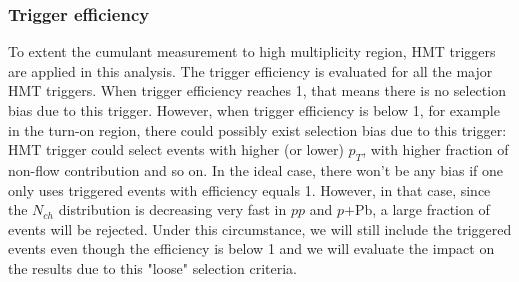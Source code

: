 \subsubsection{Trigger efficiency}
To extent the cumulant measurement to high multiplicity region, HMT triggers are applied in this analysis. The trigger efficiency is evaluated for all the major HMT triggers. When trigger efficiency reaches 1, that means there is no selection bias due to this trigger. However, when trigger efficiency is below 1, for example in the turn-on region, there could possibly exist selection bias due to this trigger: HMT trigger could select events with higher (or lower) $p_{T}$, with higher fraction of non-flow contribution and so on. In the ideal case, there won't be any bias if one only uses triggered events with efficiency equals 1. However, in that case, since the $N_{ch}$ distribution is decreasing very fast in $pp$ and $p$+Pb, a large fraction of events will be rejected. Under this circumstance, we will still include the triggered events even though the efficiency is below 1 and we will evaluate the impact on the results due to this "loose" selection criteria.

